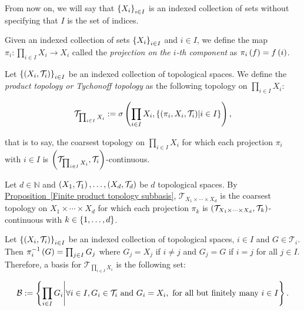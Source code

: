 From now on, we will say that $\left\{X_i\right\}_{i\in I}$ is an indexed collection of sets without specifying that $I$ is the set of indices.

Given an indexed collection of sets $\left\{X_i\right\}_{i\in I}$ and $i\in I$, we define the map $\pi_i:\prod_{i\in I}{X_i}\rightarrow X_i$ called the \textit{projection on the $i$-th component} as $\pi_i\left(f\right)=f\left(i\right)$.

\begin{definition}
  Let $\left\{\left(X_i,\mathcal{T}_i\right)\right\}_{i\in I}$ be an indexed collection of topological spaces. We define the \textit{product topology or Tychonoff topology} as the following topology on $\prod_{i\in I}{X_i}$:

  \begin{equation}
    \mathcal{T}_{\prod_{i\in I}{X_i}}:=\sigma\left(\prod_{i\in I}{X_i},\left\{\left(\pi_i,X_i,\mathcal{T}_i\right)\middle|i\in I\right\}\right),
  \end{equation}

  that is to say, the coarsest topology on $\prod_{i\in I}{X_i}$ for which each projection $\pi_i$ with $i\in I$ is $\left(\mathcal{T}_{\prod_{i\in I}{X_i}},\mathcal{T}_i\right)$-continuous.
\end{definition}

\begin{remark}
  Let $d\in\mathbb{N}$ and $\left(X_1,\mathcal{T}_1\right),\dots,\left(X_d,\mathcal{T}_d\right)$ be $d$ topological spaces. By \hyperref[Finite product topology subbasis]{Proposition~\ref*{Finite product topology subbasis}}, $\mathcal{T}_{X_1\times\cdots\times X_d}$ is the coarsest topology on $X_1\times\cdots\times X_d$ for which each projection $\pi_k$ is $\left(\mathcal{T}_{X_1\times\cdots\times X_d},\mathcal{T}_k\right)$-continuous with $k\in\left\{1,\dots,d\right\}$.
\end{remark}

\begin{remark}
  Let $\left\{\left(X_i,\mathcal{T}_i\right)\right\}_{i\in I}$ be an indexed collection of topological spaces, $i\in I$ and $G\in\mathcal{T}_i$. Then $\pi_i^{-1}\left(G\right)=\prod_{j\in I}{G_j}$ where $G_j=X_j$ if $i\neq j$ and $G_j=G$ if $i=j$ for all $j\in I$. Therefore, a basis for $\mathcal{T}_{\prod_{i\in I}{X_i}}$ is the following set:

  \begin{equation}
    \mathcal{B}:=\left\{\prod_{i\in I}{G_i}\middle|\forall i\in I,G_i\in\mathcal{T}_i\text{ and }G_i=X_i,\text{ for all but finitely many }i\in I\right\}.
  \end{equation}
\end{remark}

